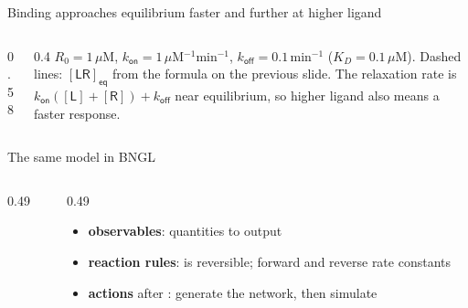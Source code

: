 \documentclass[aspectratio=169,10pt,t]{beamer}
\newcommand{\modeldir}{../../models/ch01}
\newcommand{\conc}[1]{[\mathsf{#1}]}
\begin{document}
\begin{frame}{Binding approaches equilibrium faster and further at higher ligand}
  \begin{columns}[c]
    \begin{column}{0.58\textwidth}
    \end{column}
    \begin{column}{0.4\textwidth}
      \small
      $R_0 = 1\,\mu$M, $k_\mathsf{on} = 1\,\mu$M$^{-1}$min$^{-1}$,
      $k_\mathsf{off} = 0.1\,$min$^{-1}$ ($K_D = 0.1\,\mu$M).
      \vskip2mm
      Dashed lines: $\conc{LR}_\mathsf{eq}$ from the formula on the previous slide.
      \vskip2mm
      The relaxation rate is $k_\mathsf{on}(\conc{L}+\conc{R}) + k_\mathsf{off}$
      near equilibrium, so higher ligand also means a faster response.
    \end{column}
  \end{columns}
\end{frame}

\begin{frame}[fragile]{The same model in BNGL}
  \begin{columns}[T]
    \begin{column}{0.49\textwidth}
      
    \end{column}
    \begin{column}{0.49\textwidth}
      
      \vskip1mm
      {\scriptsize
      \begin{itemize}
        \item<3-> \textbf{observables}: quantities to output
        \item<4-> \textbf{reaction rules}: \code{<->} is reversible; forward and reverse rate constants
        \item<5-> \textbf{actions} after : generate the network, then simulate
      \end{itemize}}
    \end{column}
  \end{columns}
\end{frame}
\end{document}
